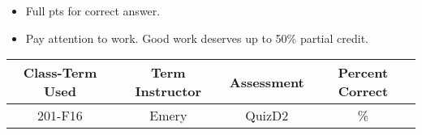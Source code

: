 \begin{rubric}

\begin{itemize}
	\item Full pts for correct answer. 
	\item Pay attention to work. Good work deserves up to 50\% partial credit.
\end{itemize}
\end{rubric}

\begin{outcomes}

\begin{center}
	\begin{tabular}{cccc}
		\hline \hline
		Class-Term Used & Term Instructor & Assessment & Percent Correct\\
		\hline
		201-F16 & Emery & QuizD2 & \%\\
		\hline
	\end{tabular}
\end{center}

\end{outcomes}

\begin{comments}

\end{comments}
